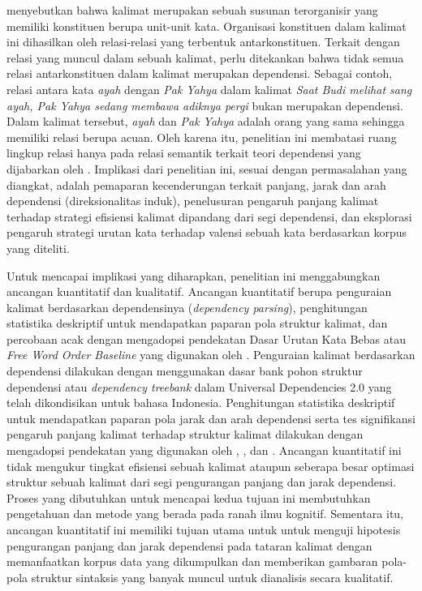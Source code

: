 \cite{tesniere1959elements} menyebutkan bahwa kalimat merupakan sebuah susunan terorganisir yang memiliki konstituen berupa unit-unit kata. Organisasi konstituen dalam kalimat ini dihasilkan oleh relasi-relasi yang terbentuk antarkonstituen. Terkait dengan relasi yang muncul dalam sebuah kalimat, perlu ditekankan bahwa tidak semua relasi antarkonstituen dalam kalimat merupakan dependensi. Sebagai contoh, relasi antara kata \textit{ayah} dengan \textit{Pak Yahya} dalam kalimat \textit{Saat Budi melihat sang ayah, Pak Yahya sedang membawa adiknya pergi} bukan merupakan dependensi. Dalam kalimat tersebut, \textit{ayah} dan \textit{Pak Yahya} adalah orang yang sama sehingga memiliki relasi berupa acuan. Oleh karena itu, penelitian ini membatasi ruang lingkup relasi hanya pada relasi semantik terkait teori dependensi yang dijabarkan oleh \cite{tesniere1959elements}. Implikasi dari penelitian ini, sesuai dengan permasalahan yang diangkat, adalah pemaparan kecenderungan terkait panjang, jarak dan arah dependensi (direksionalitas induk), penelusuran pengaruh panjang kalimat terhadap strategi efisiensi kalimat dipandang dari segi dependensi, dan eksplorasi pengaruh strategi urutan kata terhadap valensi sebuah kata berdasarkan korpus yang diteliti. 

Untuk mencapai implikasi yang diharapkan, penelitian ini menggabungkan ancangan kuantitatif dan kualitatif. Ancangan kuantitatif berupa penguraian kalimat berdasarkan dependensinya (\textit{dependency parsing}), penghitungan statistika deskriptif untuk mendapatkan paparan pola struktur kalimat, dan percobaan acak dengan mengadopsi pendekatan Dasar Urutan Kata Bebas atau \textit{Free Word Order Baseline} yang digunakan oleh \cite{futrell2015large}. Penguraian kalimat berdasarkan dependensi dilakukan dengan menggunakan dasar bank pohon struktur dependensi atau \textit{dependency treebank} dalam Universal Dependencies 2.0 \citep{nivre2017universal} yang telah dikondisikan untuk bahasa Indonesia. Penghitungan statistika deskriptif untuk mendapatkan paparan pola jarak dan arah dependensi serta tes signifikansi pengaruh panjang kalimat terhadap struktur kalimat dilakukan dengan mengadopsi pendekatan yang digunakan oleh \cite{gildea2010grammars}, \cite{futrell2015large}, \cite{jiang2015effects} dan \cite{liu2017dependency}. Ancangan kuantitatif ini tidak mengukur tingkat efisiensi sebuah kalimat ataupun seberapa besar optimasi struktur sebuah kalimat dari segi pengurangan panjang dan jarak dependensi. Proses yang dibutuhkan untuk mencapai kedua tujuan ini membutuhkan pengetahuan dan metode yang berada pada ranah ilmu kognitif. Sementara itu, ancangan kuantitatif ini memiliki tujuan utama untuk untuk menguji hipotesis pengurangan panjang dan jarak dependensi pada tataran kalimat dengan memanfaatkan korpus data yang dikumpulkan dan memberikan gambaran pola-pola struktur sintaksis yang banyak muncul untuk dianalisis secara kualitatif.

